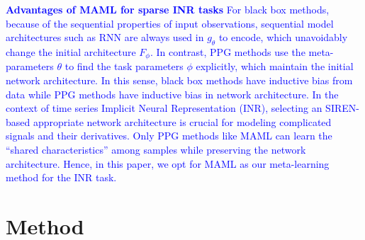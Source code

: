 \documentclass{article}
\begin{document}
\textcolor{blue}{
\textbf{Advantages of MAML for sparse INR tasks}
For black box methods, because of the sequential properties of input observations, sequential model architectures such as RNN are always used in $g_\theta$ to encode, which unavoidably change the initial architecture $F_\phi$.
In contrast, PPG methods use the meta-parameters $\theta$ to find the task parameters $\phi$ explicitly, which maintain the initial network architecture.
In this sense, black box methods have inductive bias from data while PPG methods have inductive bias in network architecture.
In the context of time series Implicit Neural Representation (INR), selecting an SIREN-based appropriate network architecture is crucial for modeling complicated signals and their derivatives.
Only PPG methods like MAML can learn the ``shared characteristics'' among samples while preserving the network architecture.
Hence, in this paper, we opt for MAML as our meta-learning method for the INR task.
}



\section{Method}
\end{document}
